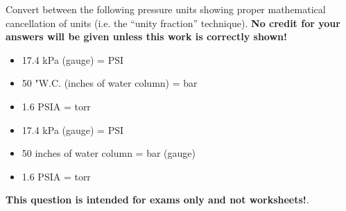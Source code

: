 

Convert between the following pressure units showing proper mathematical cancellation of units (i.e. the ``unity fraction'' technique).  {\bf No credit for your answers will be given unless this work is correctly shown!}

\begin{itemize}
\item{} 17.4 kPa (gauge) = \underbar{\hskip 50pt} PSI
\item{} 50 "W.C. (inches of water column) = \underbar{\hskip 50pt} bar
\item{} 1.6 PSIA = \underbar{\hskip 50pt} torr
\end{itemize}







\begin{itemize}
\item{} 17.4 kPa (gauge) =  PSI
\item{} 50 inches of water column =  bar (gauge)
\item{} 1.6 PSIA =  torr
\end{itemize}







{\bf This question is intended for exams only and not worksheets!}.


